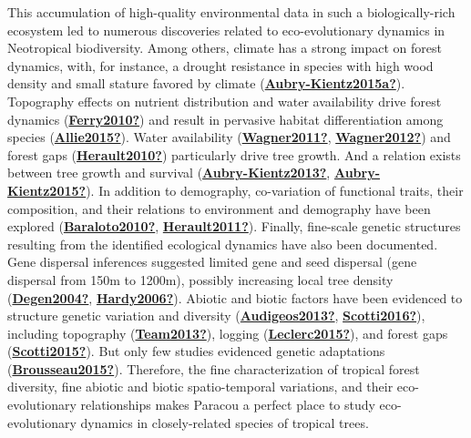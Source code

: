 \documentclass[12pt,twoside,a4paper, a]{article}
\begin{document}
This accumulation of high-quality environmental data in such a biologically-rich ecosystem led to numerous discoveries related to eco-evolutionary dynamics in Neotropical biodiversity.
Among others, climate has a strong impact on forest dynamics, with, for instance, a drought resistance in species with high wood density and small stature favored by climate (\protect\hyperlink{ref-Aubry-Kientz2015a}{\textbf{Aubry-Kientz2015a?}}).
Topography effects on nutrient distribution and water availability drive forest dynamics (\protect\hyperlink{ref-Ferry2010}{\textbf{Ferry2010?}})
and result in pervasive habitat differentiation among species (\protect\hyperlink{ref-Allie2015}{\textbf{Allie2015?}}).
Water availability (\protect\hyperlink{ref-Wagner2011}{\textbf{Wagner2011?}}, \protect\hyperlink{ref-Wagner2012}{\textbf{Wagner2012?}}) and forest gaps (\protect\hyperlink{ref-Herault2010}{\textbf{Herault2010?}}) particularly drive tree growth.
And a relation exists between tree growth and survival (\protect\hyperlink{ref-Aubry-Kientz2013}{\textbf{Aubry-Kientz2013?}}, \protect\hyperlink{ref-Aubry-Kientz2015}{\textbf{Aubry-Kientz2015?}}).
In addition to demography, co-variation of functional traits, their composition, and their relations to environment and demography have been explored (\protect\hyperlink{ref-Baraloto2010}{\textbf{Baraloto2010?}}, \protect\hyperlink{ref-Herault2011}{\textbf{Herault2011?}}).
Finally, fine-scale genetic structures resulting from the identified ecological dynamics have also been documented.
Gene dispersal inferences suggested limited gene and seed dispersal (gene dispersal from 150m to 1200m), possibly increasing local tree density (\protect\hyperlink{ref-Degen2004}{\textbf{Degen2004?}}, \protect\hyperlink{ref-Hardy2006}{\textbf{Hardy2006?}}).
Abiotic and biotic factors have been evidenced to structure genetic variation and diversity (\protect\hyperlink{ref-Audigeos2013}{\textbf{Audigeos2013?}}, \protect\hyperlink{ref-Scotti2016}{\textbf{Scotti2016?}}), including topography (\protect\hyperlink{ref-Team2013}{\textbf{Team2013?}}), logging (\protect\hyperlink{ref-Leclerc2015}{\textbf{Leclerc2015?}}), and forest gaps (\protect\hyperlink{ref-Scotti2015}{\textbf{Scotti2015?}}).
But only few studies evidenced genetic adaptations (\protect\hyperlink{ref-Brousseau2015}{\textbf{Brousseau2015?}}).
Therefore, the fine characterization of tropical forest diversity, fine abiotic and biotic spatio-temporal variations, and their eco-evolutionary relationships makes Paracou a perfect place to study eco-evolutionary dynamics in closely-related species of tropical trees.
\end{document}
